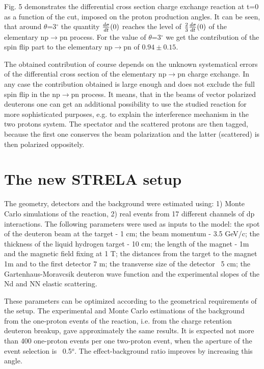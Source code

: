 \documentclass[a4paper,12pt]{article}
\begin{document}
Fig. 5 demonstrates the differential cross section charge exchange
reaction at t=0 as a function of the cut, imposed
on the proton production angles. It can be seen, that around $\theta$=3$^\circ$
the quantity ${d\sigma\over dt}(0)$ reaches the level of
${2\over3}{d\sigma\over dt}(0)$ of the elementary np$\to$pn process.
For the value of $\theta$=3$^\circ$ we get the contribution of the spin
flip part to the elementary np$\to$pn of $0.94 \pm 0.15$.

The obtained contribution of course depends on the unknown  systematical
errors of the
differential cross section of the elementary np$\to$pn charge exchange.
In any case the contribution obtained is large enough and does not exclude
the full spin flip in the np$\to$pn process. It means, that in the beams
of vector  polarized deuterons one can get an additional possibility
to use the studied reaction for more sophisticated purposes, e.g. to
explain the interference mechanism in the two protons system. The
spectator and the scattered protons are then tagged, because the first
one conserves the beam polarization and the latter (scattered) is then
polarized oppositely.


\section{The new STRELA setup}

\hspace{0.5cm}  The geometry, detectors and the background were estimated using:
1) Monte Carlo simulations of the   reaction,
2) real events from 17 different channels of dp interactions.
The following parameters were used as inputs to the model: the spot of the
deuteron beam at the target - 1 cm; the beam momentum - 3.5 GeV/c;
the thickness of the liquid hydrogen target - 10 cm;
the length of the magnet - 1m and the magnetic field fixing at 1 T;
the distances from the target to the magnet 1m and to the first detector 7 m;
the transverse size of the detector ~5 cm;
the  Gartenhaus-Moravcsik deuteron wave function  and the experimental
slopes of the Nd and NN elastic scattering.

These parameters can be optimized according to the geometrical requirements
of the setup. The experimental and Monte Carlo estimations of the background from the
one-proton events of the   reaction, i.e. from the charge retention deuteron
breakup, gave approximately the same results. It is expected not more
than 400 one-proton events per one two-proton event, when the aperture
of the event selection is ~0.5$^o$.
The effect-background ratio improves by increasing this angle.
\end{document}
